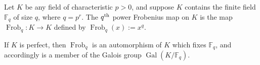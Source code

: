 \documentclass[12pt]{article}
\newcommand{\Frob}{\operatorname{Frob}}
\begin{document}
Let $K$ be any field of characteristic $p > 0$, and suppose $K$ contains the finite field $\mathbb{F}_q$ of size $q$, where $q = p^r$. The $q^{\rm th}$ power Frobenius map on $K$ is the map $\Frob_q: K \longrightarrow K$ defined by $\Frob_q(x) := x^q$.

If $K$ is perfect, then $\Frob_q$ is an automorphism of $K$ which fixes $\mathbb{F}_q$, and accordingly is a member of the Galois group $\operatorname{Gal}(K/\mathbb{F}_q)$.
\end{document}
